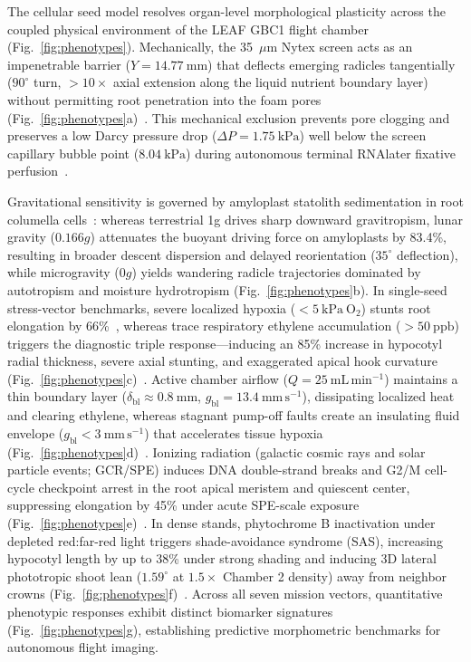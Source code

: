 \documentclass[10pt,twocolumn,twoside]{article}
\begin{document}
The cellular seed model resolves organ-level morphological plasticity across the coupled physical environment of the LEAF GBC1 flight chamber (Fig.~\ref{fig:phenotypes}). Mechanically, the 35~$\mu$m Nytex screen acts as an impenetrable barrier ($Y = 14.77\ \mathrm{mm}$) that deflects emerging radicles tangentially ($90^\circ$ turn, $> 10\times$ axial extension along the liquid nutrient boundary layer) without permitting root penetration into the foam pores (Fig.~\ref{fig:phenotypes}a)~\cite{bassel2014}. This mechanical exclusion prevents pore clogging and preserves a low Darcy pressure drop ($\Delta P = 1.75\ \mathrm{kPa}$) well below the screen capillary bubble point ($8.04\ \mathrm{kPa}$) during autonomous terminal RNAlater fixative perfusion~\cite{haveman2022utilizing}.

Gravitational sensitivity is governed by amyloplast statolith sedimentation in root columella cells~\cite{canaday2026}: whereas terrestrial 1g drives sharp downward gravitropism, lunar gravity ($0.166g$) attenuates the buoyant driving force on amyloplasts by 83.4\%, resulting in broader descent dispersion and delayed reorientation ($35^\circ$ deflection), while microgravity ($0g$) yields wandering radicle trajectories dominated by autotropism and moisture hydrotropism (Fig.~\ref{fig:phenotypes}b). In single-seed stress-vector benchmarks, severe localized hypoxia ($< 5\ \mathrm{kPa}\ \mathrm{O}_2$) stunts root elongation by 66\%~\cite{park2016,zhou2017}, whereas trace respiratory ethylene accumulation ($> 50\ \mathrm{ppb}$) triggers the diagnostic triple response---inducing an 85\% increase in hypocotyl radial thickness, severe axial stunting, and exaggerated apical hook curvature (Fig.~\ref{fig:phenotypes}c)~\cite{binder2004}. Active chamber airflow ($Q = 25\ \mathrm{mL\,min^{-1}}$) maintains a thin boundary layer ($\delta_{\mathrm{bl}} \approx 0.8\ \mathrm{mm}$, $g_{\mathrm{bl}} = 13.4\ \mathrm{mm\,s^{-1}}$), dissipating localized heat and clearing ethylene, whereas stagnant pump-off faults create an insulating fluid envelope ($g_{\mathrm{bl}} < 3\ \mathrm{mm\,s^{-1}}$) that accelerates tissue hypoxia (Fig.~\ref{fig:phenotypes}d)~\cite{wheeler1996,kitaya2003air}. Ionizing radiation (galactic cosmic rays and solar particle events; GCR/SPE) induces DNA double-strand breaks and G2/M cell-cycle checkpoint arrest in the root apical meristem and quiescent center, suppressing elongation by 45\% under acute SPE-scale exposure (Fig.~\ref{fig:phenotypes}e)~\cite{zhang2020,george2024,nagata2004,beemster1998}. In dense stands, phytochrome B inactivation under depleted red:far-red light triggers shade-avoidance syndrome (SAS), increasing hypocotyl length by up to 38\% under strong shading and inducing 3D lateral phototropic shoot lean ($1.59^\circ$ at $1.5\times$ Chamber 2 density) away from neighbor crowns (Fig.~\ref{fig:phenotypes}f)~\cite{ballare2017}. Across all seven mission vectors, quantitative phenotypic responses exhibit distinct biomarker signatures (Fig.~\ref{fig:phenotypes}g), establishing predictive morphometric benchmarks for autonomous flight imaging.
\end{document}

